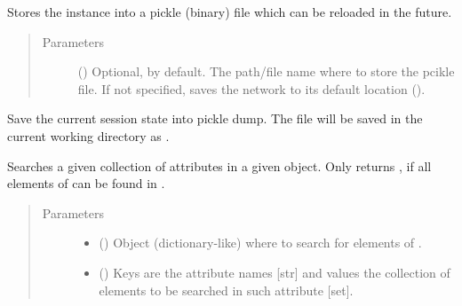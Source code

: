 \documentclass[letterpaper,10pt,english]{sphinxmanual}
\begin{document}
\begin{fulllineitems}
\begin{fulllineitems}
Stores the instance into a pickle (binary) file which can be
reloaded in the future.
\begin{quote}\begin{description}
\item[{Parameters}] \leavevmode
{} () \textendash{} Optional,  by default. The path/file name where to
store the pcikle file. If not specified, saves the network
to its default location
().

\end{description}\end{quote}

\end{fulllineitems}


\begin{fulllineitems}
\label{\detokenize{main:pypath.main.PyPath.save_session}}
Save the current session state into pickle dump. The file will
be saved in the current working directory as
.

\end{fulllineitems}


\begin{fulllineitems}
\label{\detokenize{main:pypath.main.PyPath.search_attr_and}}
Searches a given collection of attributes in a given object.
Only returns , if all elements of  can be found in
.
\begin{quote}\begin{description}
\item[{Parameters}] \leavevmode\begin{itemize}
\item {} 
 () \textendash{} Object (dictionary-like) where to search for elements of
.

\item {} 
 () \textendash{} Keys are the attribute names {[}str{]} and values the collection
of elements to be searched in such attribute {[}set{]}.


\end{itemize}
\end{description}
\end{quote}
\end{fulllineitems}
\end{fulllineitems}
\end{document}
